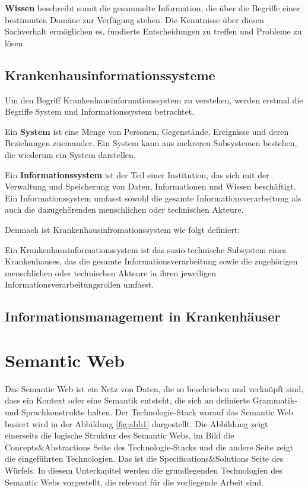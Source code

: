 \textbf{Wissen} beschreibt somit die gesammelte Information, die über die Begriffe einer bestimmten Domäne zur Verfügung stehen. 
Die Kenntnisse über diesen Sachverhalt ermöglichen es, fundierte Entscheidungen zu treffen und Probleme zu lösen.

\subsection{Krankenhausinformationssysteme}

Um den Begriff Krankenhausinformationssystem zu verstehen, werden erstmal die Begriffe System und Informationssystem betrachtet. \newline

Ein \textbf{System} ist eine Menge von Personen, Gegenstände, Ereignisse und deren Beziehungen zueinander. 
Ein System kann aus mehreren Subsystemen bestehen, die wiederum ein System darstellen. \citep[vgl.]{winter_health_2011} \newline

Ein \textbf{Informationssystem} ist der Teil einer Institution, das sich mit der Verwaltung und Speicherung von Daten, Informationen und Wissen beschäftigt.
Ein Informationssystem umfasst sowohl die gesamte Informationsverarbeitung als auch die dazugehörenden menschlichen oder technischen Akteure. \citep[vgl.]{winter_health_2011} \newline

Demnach ist Krankenhausinfromationssystem wie folgt definiert:

\begin{definition}
	Ein Krankenhausinformationssystem ist das sozio-technische Subsystem eines Krankenhauses, das die gesamte Informationsverarbeitung sowie die zugehörigen menschlichen oder technischen Akteure in ihren jeweiligen Informationsverarbeitungsrollen umfasst. \citet{winter_health_2011}
\end{definition}

\subsection{Informationsmanagement in Krankenhäuser}



\section{Semantic Web}\label{sec:sw}

Das Semantic Web ist ein Netz von Daten, die so beschrieben und verknüpft sind, dass ein Kontext oder eine Semantik entsteht, die sich an definierte Grammatik- und Sprachkonstrukte halten. \citep[vgl.]{hebeler_semantic_2009}
Der Technologie-Stack worauf das Semantic Web basiert wird in der Abbildung \ref{fig:abb1} dargestellt.
Die Abbildung zeigt einerseits die logische Struktur des Semantic Webs, im Bild die Concepts\&Abstractions Seite des Technologie-Stacks und die andere Seite zeigt die eingeführten Technologien.
Das ist die Specifications\&Solutions Seite des Würfels.
In diesem Unterkapitel werden die grundlegenden Technologien des Semantic Webs vorgestellt, die relevant für die vorliegende Arbeit sind.

